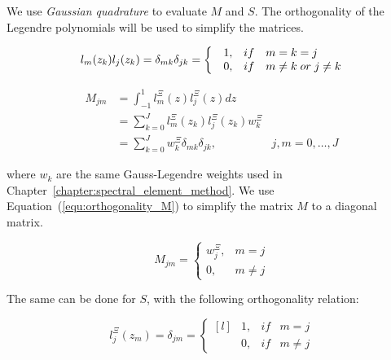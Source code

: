 We use \textit{Gaussian quadrature} to evaluate \(M\) and \(S\). The orthogonality of the Legendre
polynomials will be used to simplify the matrices.

\begin{equation} \label{equ:orthogonality_M}
    l_m (z_k) l_j (z_k) = \\
    \delta _{mk} \delta _{j k} = \left \{ \begin{matrix*}[l]
        & 1, & if & m = k = j \\
        & 0, & if & m \neq k \; or \; j \neq k
    \end{matrix*}\right.
\end{equation}

\begin{equation} \label{equ:matrix_M}
    \begin{aligned}
        M_{jm} & = \int_{-1}^{1} l_m ^ \Xi (z) l_j ^ \Xi (z) dz                                    \\
               & = \sum_{k = 0}^{J} l_m ^ \Xi (z_k) l_j ^ \Xi (z_k)w_k ^ \Xi                       \\
               & = \sum_{k = 0}^{J} w_k ^ \Xi \delta_{mk}\delta_{jk},        & j, m = 0, \ldots, J
    \end{aligned}
\end{equation}

\noindent
where \(w_k\) are the same Gauss-Legendre weights used in
Chapter~\ref{chapter:spectral_element_method}. We use Equation~(\ref{equ:orthogonality_M}) to
simplify the matrix \(M\) to a diagonal matrix.

\begin{equation}
    M_{jm} = \left \{ \begin{matrix}
        w_j^{\Xi }, & m = j     \\
        0,          & m \neq  j
    \end{matrix}\right.
\end{equation}

\noindent
The same can be done for \(S\), with the following orthogonality relation:

\begin{equation} \label{equ:orthogonality_S}
    l_j ^ \Xi (z_m) = \delta_{jm} = \left \{ \begin{matrix*}[l]
        & 1, & if & m = j\\
        & 0, & if & m \neq j
    \end{matrix*}\right.
\end{equation}

